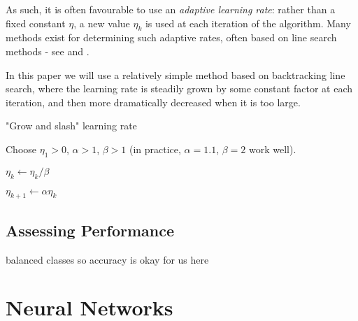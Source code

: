 \documentclass{article}[11pt]
\begin{document}
            As such, it is often favourable to use an \textit{adaptive learning rate}: rather than a fixed constant $\eta$, a new value $\eta_k$ is used at each iteration of the algorithm. Many methods exist for determining such adaptive rates, often based on line search methods - see \cite{line_search} and \cite{adam}.
            
            In this paper we will use a relatively simple method based on backtracking line search, where the learning rate is steadily grown by some constant factor at each iteration, and then more dramatically decreased when it is too large.
            
            
            \begin{algorithm} \label{alg:grow_and_slash}
                
                \caption{"Grow and slash" learning rate}
                
                \begin{algorithmic}
                
                    \State Choose $\eta_1 > 0$, $\alpha > 1$, $\beta > 1$ (in practice, $\alpha = 1.1$, $\beta = 2$ work well).
                    
                            \State $\eta_k \gets \eta_k / \beta$
                        \EndWhile
                        
                        \State $\eta_{k+1} \gets \alpha \eta_k$
                    \EndFor
                    
                \end{algorithmic}
            
            \end{algorithm}
            
            
    
            
    \subsection{Assessing Performance}
        
        
        balanced classes so accuracy is okay for us here



\section{Neural Networks}
    
\end{document}
